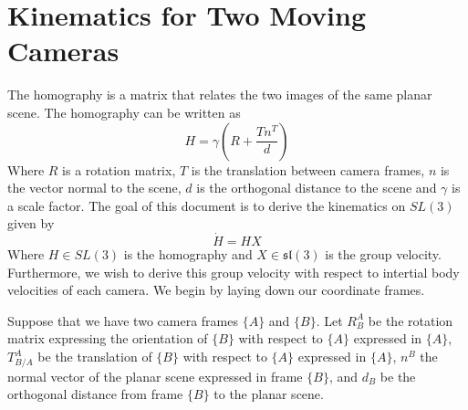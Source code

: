 \documentclass[a4paper]{article}
\begin{document}
\section*{Kinematics for Two Moving Cameras}
The homography is a matrix that relates the two images of the same planar scene. The homography can be written as
\[
    H = \gamma \left( R + \frac{Tn^T}{d} \right)
\]
Where $R$ is a rotation matrix, $T$ is the translation between camera frames, $n$ is the vector normal to the scene, $d$ is the orthogonal distance to the scene and $\gamma$ is a scale factor. The goal of this document is to derive the kinematics on $SL(3)$ given by
\[
    \dot{H} = HX
\]
Where $H \in SL(3)$ is the homography and $X \in \mathfrak{sl}(3)$ is the group velocity. Furthermore, we wish to derive this group velocity with respect to intertial body velocities of each camera. We begin by laying down our coordinate frames.

Suppose that we have two camera frames $\{A\}$ and $\{B\}$. Let $R_B^A$ be the rotation matrix expressing the orientation of $\{B\}$ with respect to $\{A\}$ expressed in $\{A\}$, $T_{B/A}^A$ be the translation of $\{B\}$ with respect to $\{A\}$ expressed in $\{A\}$, $n^B$ the normal vector of the planar scene expressed in frame $\{B\}$, and $d_B$ be the orthogonal distance from frame $\{B\}$ to the planar scene.
\end{document}
